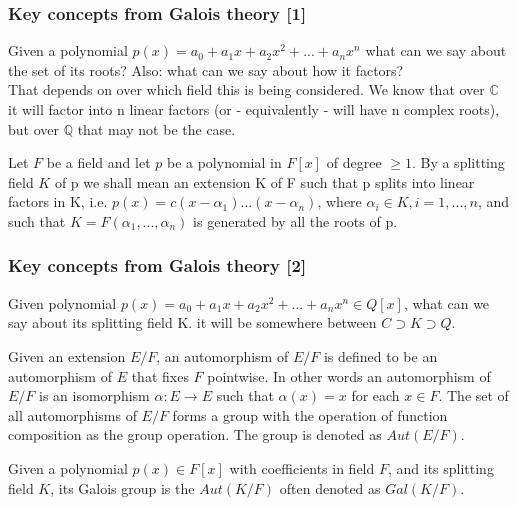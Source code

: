 \documentclass{beamer}
\begin{document}
\begin{frame}
\frametitle{Key concepts from Galois theory [1]}
Given a polynomial $p(x) = a_0+a_1x+a_2x^2+...+a_nx^n$ what can we say about the set of its roots? Also: what can we say about how it factors?
\\
That depends on over which field this is being considered. We know that over $\mathbb{C}$ it will factor into n linear factors (or - equivalently - will have n complex roots), but over $\mathbb{Q}$ that may not be the case.
\begin{definition}
Let $F$ be a field and let $p$ be a polynomial in $F[x]$ of degree $\ge 1$. By a splitting field $K$ of p we shall mean an extension K of F such that p splits into linear factors in K, i.e. $p(x) = c(x-\alpha_1)...(x-\alpha_n)$, where $\alpha_i \in 
 K, i=1,...,n$, and such that $K=F(\alpha_1,...,\alpha_n)$ is generated by all the roots of p. 
\end{definition}

\end{frame}

\begin{frame}
\frametitle{Key concepts from Galois theory [2]}
Given polynomial $p(x) = a_0+a_1x+a_2x^2+...+a_nx^n \in Q[x]$, what can we say about its splitting field K. it will be somewhere between $C \supset K \supset Q$.


\begin{definition}
Given an extension $E/F$, an automorphism of $E/F$ is defined to be an automorphism of $E$ that fixes $F$ pointwise. In other words an automorphism of $E/F$ is an isomorphism $\alpha : E \rightarrow E$ such that $\alpha(x)=x$ for each $x \in F$. The set of all automorphisms of $E/F$ forms a group with the operation of function composition as the group operation. The group is denoted as $Aut(E/F)$.
\end{definition}
\begin{definition}
Given a polynomial $p(x) \in F[x]$ with coefficients in field $F$, and its splitting field $K$, its Galois group is the $Aut(K/F)$ often denoted as $Gal(K/F)$.
\end{definition}


\end{frame}
\end{document}
